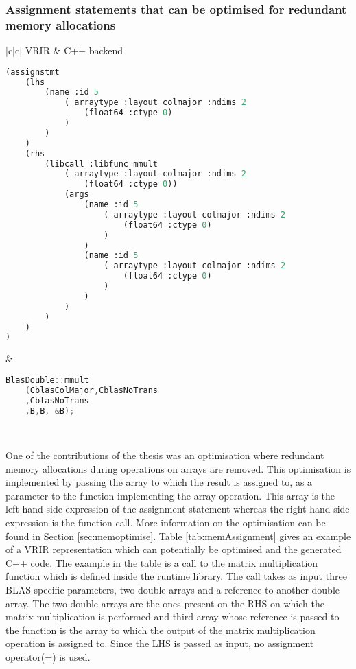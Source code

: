 \subsubsection{Assignment statements that can be optimised  for redundant memory allocations}
\begin{table}[htbp]
\begin{tabular}{|c|c|}
\hline 
VRIR & C++ backend \\
\hline 
{
\begin{lstlisting}[language=lisp, frame=none, numbers=none]
(assignstmt
	(lhs
		(name :id 5
   			( arraytype :layout colmajor :ndims 2
				(float64 :ctype 0)
			)
		)
	)
	(rhs
		(libcall :libfunc mmult
			( arraytype :layout colmajor :ndims 2
				(float64 :ctype 0))
			(args
   				(name :id 5
   					( arraytype :layout colmajor :ndims 2
						(float64 :ctype 0)
					)
				)
				(name :id 5
					( arraytype :layout colmajor :ndims 2
						(float64 :ctype 0)
					)
				)
			)
		)
	)
)
\end{lstlisting}
} & 
{
\begin{lstlisting}[language=c,frame=none, numbers=none]
BlasDouble::mmult
	(CblasColMajor,CblasNoTrans
	,CblasNoTrans
	,B,B, &B);
\end{lstlisting}
} \\
\hline
\end{tabular}
\caption[Assignment with Memory optimisation]{Table shows VRIR with array operations on the LHS and the equivalent C++ code that is generated and optimised.}
\label{tab:memAssignment}
\end{table}
One of the contributions of the thesis was an optimisation where redundant memory allocations during operations on arrays are removed. This optimisation is implemented by passing the array to which the result is assigned to, as a parameter to the function implementing the array operation. This array is the left hand side expression of the assignment statement whereas the right hand side expression is the function call. More information on the optimisation can be found in Section \ref{sec:memoptimise}. Table \ref{tab:memAssignment} gives an example of a VRIR representation which can potentially be optimised and the generated C++ code.  The example in the table is a call to the matrix multiplication function which is defined inside the runtime library. The call takes as input three BLAS specific parameters, two double arrays and a reference to another double array. The two double arrays are the ones present on the RHS on which the matrix multiplication is performed and third array whose reference is passed to the function is the array to which the output of the matrix multiplication operation is assigned to. Since the LHS is passed as input, no assignment operator(=) is used.

